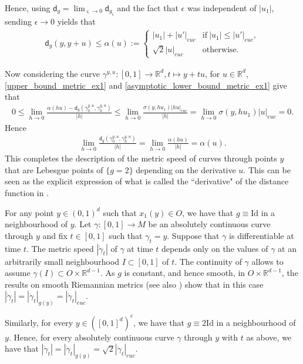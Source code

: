 \documentclass[a4paper,10pt]{article}
\numberwithin{equation}{section}
\newcommand{\R}{\mathbb{R}}
\newcommand{\sfd}{\mathsf d}
\begin{document}
Hence, using $\sfd_g = \lim_{\varsigma \to 0} \sfd_{g_\varsigma}$ and the fact that $\epsilon$ was independent of $|u_1|$, sending $\epsilon \to 0$ yields that 
\begin{align}\label{upper_bound_metric_ex1}
    \sfd_g(y, y+u) \leq \alpha(u):= \left\{ \begin{array}{ll}
           |u_1| + |u'|_{euc}  & \mathrm{if}\ |u_1| \leq |u'|_{euc}, \\
           \sqrt{2}|u|_{euc}\  & \mathrm{otherwise}.
        \end{array}\right.
\end{align}

Now considering the curve $\gamma^{y,u}:[0,1] \to \R^d, t \mapsto y+tu$, for $u \in \R^d$, \eqref{upper_bound_metric_ex1} and \eqref{asymptotic_lower_bound_metric_ex1} give that 
\begin{align*}
    0 \leq \lim_{h \to 0} \frac{\alpha(hu)-\sfd_g(\gamma^{y,u}_0, \gamma^{y,u}_h)}{|h|} \leq \lim_{h \to 0} \frac{\sigma(y, hu_1)|hu|_{euc}}{|h|} = \lim_{h \to 0} \sigma(y, hu_1)|u|_{euc} =0.
\end{align*}
Hence
\begin{align*}
    \lim_{h \to 0} \frac{\sfd_g(\gamma^{y,u}_0, \gamma^{y,u}_h)}{|h|} = \lim_{h \to 0} \frac{\alpha(hu)}{|h|} = \alpha(u).
\end{align*}
This completes the description of the metric speed of curves through points $y$ that are Lebesgue points of $\{g =2\}$ depending on the derivative $u$. This can be seen as the explicit expression of what is called the ``derivative" of the distance function in \cite{de1995lip}.

For any point $y \in (0,1)^d$ such that $x_1(y) \in O$, we have that $g \equiv \mathrm{Id}$ in a neighbourhood of $y$. Let $\gamma:[0,1] \to M$ be an absolutely continuous curve through $y$ and fix $t \in [0,1]$ such that $\gamma_t =y$. Suppose that $\gamma$ is differentiable at time $t$. The metric speed $|\dot{\gamma}_t|$ of $\gamma$ at time $t$  depends only on the values of $\gamma$ at an arbitrarily small neighbourhood $I \subset [0,1]$ of $t$. The continuity of $\gamma$ allows to assume $\gamma(I) \subset O \times \R^{d-1}$. As $g$ is constant, and hence smooth, in $O \times \R^{d-1}$, the results on smooth Riemannian metrics (see also \cite[Proposition 4.10]{burtscher2012length}) show that in this case $|\dot{\gamma}_t| = |\dot{\gamma}_t|_{g(y)} = |\dot{\gamma}_t|_{euc}$. 

Similarly, for every $y \in ([0,1]^d)^c$, we have that $g \equiv 2 \mathrm{Id}$ in a neighbourhood of $y$. Hence, for every absolutely continuous curve $\gamma$ through $y$ with $t$ as above, we have that $|\dot{\gamma}_t| = |\dot{\gamma}_t|_{g(y)} = \sqrt{2}|\dot{\gamma}_t|_{euc}$.
\end{document}
